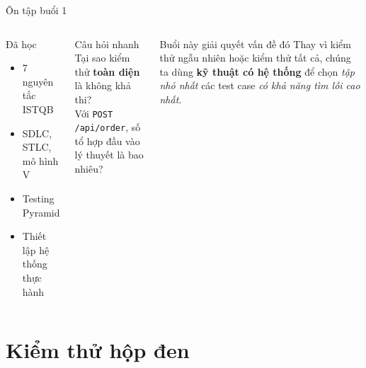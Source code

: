 \documentclass[aspectratio=169,12pt]{beamer}
\begin{document}
\begin{frame}{Ôn tập buổi 1}
  \begin{columns}
    \begin{block}{Đã học}
      \begin{itemize}
        \item 7 nguyên tắc ISTQB
        \item SDLC, STLC, mô hình V
        \item Testing Pyramid
        \item Thiết lập hệ thống thực hành
      \end{itemize}
    \end{block}
    \begin{exampleblock}{Câu hỏi nhanh}
      Tại sao kiểm thử \textbf{toàn diện} là không khả thi?\\[0.4em]
      \small Với \texttt{POST /api/order}, số tổ hợp đầu vào
      lý thuyết là bao nhiêu?
    \end{exampleblock}

    \begin{block}{Buổi này giải quyết vấn đề đó}
      Thay vì kiểm thử ngẫu nhiên hoặc kiểm thử tất cả,
      chúng ta dùng \textbf{kỹ thuật có hệ thống} để chọn
      \textit{tập nhỏ nhất} các test case \textit{có khả năng
      tìm lỗi cao nhất}.
    \end{block}
  \end{columns}
\end{frame}

\section{Kiểm thử hộp đen}
\end{document}
